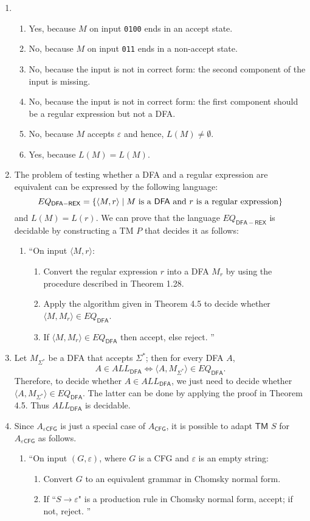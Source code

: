 \documentclass[12pt,a4paper]{ctexart}
\newenvironment{turing}[2]
{\begin{enumerate}[leftmargin=0pt,labelsep=0pt,align=left,parsep=0pt]
		\item[$#1={}$]``\ignorespaces#2
		\begin{enumerate}[nosep,align=left,labelwidth=1.5em,label=\bfseries\arabic{*}.,ref=\arabic{*}]}
		{\unskip''\end{enumerate}\end{enumerate}}
\def\eps {\varepsilon}
\def\ling{\texttt{0}}
\def\yi{\texttt{1}}
\begin{document}
\begin{enumerate}
\item[Sipser 4.1]
\begin{enumerate}
	\item[(a)] Yes, because $M$ on input \ling\yi\ling\ling{} ends in an accept state.
	\item[(b)] No, because $M$ on input \ling\yi\yi{} ends in a non-accept state.
	\item[(c)] No, because the input is not in correct form: the second component of the input is missing.
	\item[(d)] No, because the input is not in correct form: the first component should be a regular expression but not a \textsf{DFA}.
	\item[(e)] No, because $M$ accepts $\eps$ and hence, $L(M)\ne\emptyset$.
	\item[(f)] Yes, because $L(M) = L(M)$.
\end{enumerate}
\item[Sipser 4.2]
The problem of testing whether a \textsf{DFA} and a regular expression are equivalent can be expressed by the following language:
\[EQ_{\mathsf{DFA}-\mathsf{REX}}=\{\langle M,r \rangle \mid M\text{ is a \textsf{DFA} and }r\text{ is a regular expression}\}\]
and $L(M) = L(r)$. We can prove that the language $EQ_{\mathsf{DFA}-\mathsf{REX}}$ is decidable by constructing a \textsf{TM} $P$ that decides it as follows:
\begin{turing}{P}{On input $\langle M,r \rangle$:}
	\item Convert the regular expression $r$ into a \textsf{DFA} $M_r$ by using the procedure described in Theorem 1.28.
	\item Apply the algorithm given in Theorem 4.5 to decide whether $\langle M,M_r \rangle\in EQ_{\mathsf{DFA}}$.
	\item If $\langle M,M_r \rangle\in EQ_{\mathsf{DFA}}$ then accept, else reject.
\end{turing}

\item[Sipser 4.3]
Let $M_{\Sigma^*}$ be a \textsf{DFA} that accepts $\Sigma^*$; then for every \textsf{DFA} $A$,
\[A\in ALL_{\mathsf{DFA}}\Leftrightarrow\langle A,M_{\Sigma^*} \rangle\in EQ_{\mathsf{DFA}}.\]
Therefore, to decide whether $A \in ALL_{\mathsf{DFA}}$, we just need to decide whether $\langle A,M_{\Sigma^*} \rangle\in EQ_{\mathsf{DFA}}$. The latter can be done by applying the proof in Theorem 4.5. Thus $ALL_{\mathsf{DFA}}$ is decidable.
\item[Sipser 4.4]
Since $A_{\eps\mathsf{CFG}}$ is just a special case of $A_{\mathsf{CFG}}$, it is possible to adapt $\mathsf{TM}$ $S$ for $A_{\eps\mathsf{CFG}}$ as follows.
\begin{turing}{S}{On input $(G,\eps)$, where $G$ is a \textsf{CFG} and $\eps$ is an empty string:}
	\item Convert $G$ to an equivalent grammar in Chomsky normal form.
	\item If ``$S\to\eps$" is a production rule in Chomsky normal form, accept; if not, reject.
\end{turing}
\end{enumerate}
\end{document}
